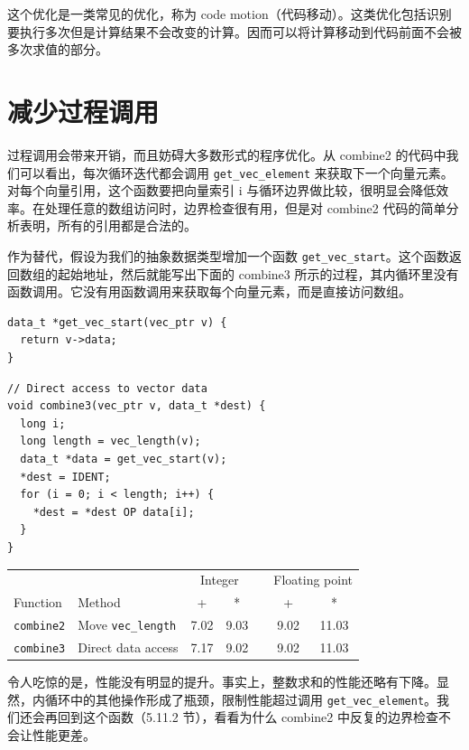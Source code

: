 这个优化是一类常见的优化，称为 code motion（代码移动）。这类优化包括识别要执行多次但是计算结果不会改变的计算。因而可以将计算移动到代码前面不会被多次求值的部分。

\section{减少过程调用}

过程调用会带来开销，而且妨碍大多数形式的程序优化。从 combine2 的代码中我们可以看出，每次循环迭代都会调用 \verb|get_vec_element| 来获取下一个向量元素。对每个向量引用，这个函数要把向量索引 i 与循环边界做比较，很明显会降低效率。在处理任意的数组访问时，边界检查很有用，但是对 combine2 代码的简单分析表明，所有的引用都是合法的。

作为替代，假设为我们的抽象数据类型增加一个函数 \verb|get_vec_start|。这个函数返回数组的起始地址，然后就能写出下面的 combine3 所示的过程，其内循环里没有函数调用。它没有用函数调用来获取每个向量元素，而是直接访问数组。

\begin{verbatim}
data_t *get_vec_start(vec_ptr v) {
  return v->data;
}
\end{verbatim}

\begin{verbatim}
// Direct access to vector data
void combine3(vec_ptr v, data_t *dest) {
  long i;
  long length = vec_length(v);
  data_t *data = get_vec_start(v);
  *dest = IDENT;
  for (i = 0; i < length; i++) {
    *dest = *dest OP data[i];
  }
}
\end{verbatim}

\begin{table}[!ht]
    \centering
    \begin{tabular}{llccccc}
        \toprule
        & & \multicolumn{2}{c}{Integer} & & \multicolumn{2}{c}{Floating point} \\
        \cmidrule{3-4} \cmidrule{6-7}
        Function & Method & + & * & & + & * \\
        \midrule
        \texttt{combine2} & Move \texttt{vec\_length} & 7.02 & 9.03 & & 9.02 & 11.03 \\
        \texttt{combine3} & Direct data access & 7.17 & 9.02 & & 9.02 & 11.03 \\
        \bottomrule
    \end{tabular}
\end{table}

令人吃惊的是，性能没有明显的提升。事实上，整数求和的性能还略有下降。显然，内循环中的其他操作形成了瓶颈，限制性能超过调用 \verb|get_vec_element|。我们还会再回到这个函数（5.11.2 节），看看为什么 combine2 中反复的边界检查不会让性能更差。

